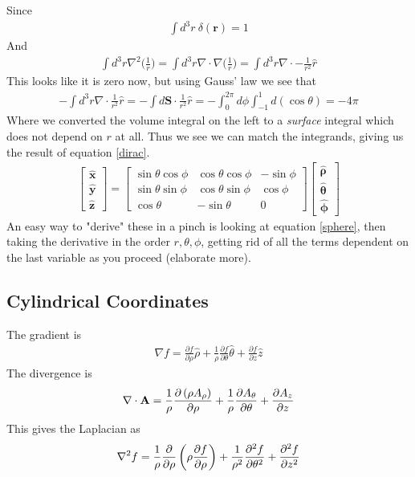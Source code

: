 Since
\begin{align}
\int d^3r ~\delta(\textbf{r}) = 1
\end{align}
And
\begin{align}
\int d^3r \nabla^2\Big(\frac{1}{r}\Big) = \int d^3r \nabla\cdot\nabla\Big(\frac{1}{r}\Big) = \int d^3 r \nabla\cdot -\frac{1}{r^2}\hat{r}
\end{align}
This looks like it is zero now, but using Gauss' law we see that
\begin{align}
- \int d^3 r \nabla\cdot \frac{1}{r^2}\hat{r} = -\int d\textbf{S}\cdot \frac{1}{r^2}\hat{r} = -\int_0^{2\pi}d\phi\int_{-1}^1 d(\cos\theta) = -4\pi
\end{align}
Where we converted the volume integral on the left to a \emph{surface} integral which does not depend on $r$ at all. Thus we see we can match the integrands, giving us the result of equation \ref{dirac}.
\begin{align}
\begin{bmatrix}\mathbf{\hat x} \\ \mathbf{\hat y}  \\ \mathbf{\hat z} \end{bmatrix}
  = \begin{bmatrix} \sin\theta\cos\phi & \cos\theta\cos\phi & -\sin\phi \\
                    \sin\theta\sin\phi & \cos\theta\sin\phi &  \cos\phi \\
                    \cos\theta         & -\sin\theta        & 0 \end{bmatrix}
    \begin{bmatrix} \boldsymbol{\hat\rho} \\ \boldsymbol{\hat\theta} \\ \boldsymbol{\hat\phi} \end{bmatrix}
\end{align}
An easy way to "derive" these in a pinch is looking at equation \ref{sphere}, then taking the derivative in the order $r,\theta,\phi$, getting rid of all the terms dependent on the last variable as you proceed (elaborate more).


\subsection{Cylindrical Coordinates}
The gradient is
\begin{align}
\nabla f = \frac{\partial f}{\partial \rho}\hat{\rho} + \frac{1}{\rho}\frac{\partial f}{\partial \theta}\hat{\theta} + \frac{\partial f}{\partial z}\hat{z}
\end{align}
The divergence is
\begin{align}
\nabla\cdot\textbf{A} = {1 \over \rho}{\partial \left( \rho A_\rho  \right) \over \partial \rho}
+ {1 \over \rho}{\partial A_\theta \over \partial \theta}
+ {\partial A_z \over \partial z}
\end{align}
This gives the Laplacian as
\begin{align}
\nabla^2 f = {1 \over \rho}{\partial \over \partial \rho}\left(\rho {\partial f \over \partial \rho}\right)
+ {1 \over \rho^2}{\partial^2 f \over \partial \theta^2}
+ {\partial^2 f \over \partial z^2}
\end{align}


